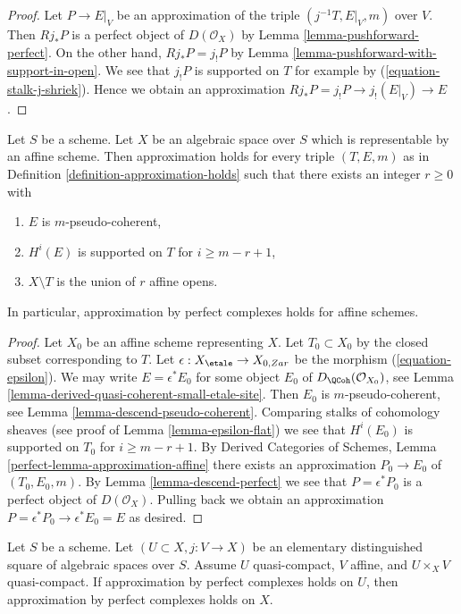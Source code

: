 \begin{proof}
Let $P \to E|_V$ be an approximation of the triple $(j^{-1}T, E|_V, m)$
over $V$. Then $Rj_*P$ is a perfect object of $D(\mathcal{O}_X)$ by
Lemma \ref{lemma-pushforward-perfect}. On the other hand,
$Rj_*P = j_!P$ by Lemma \ref{lemma-pushforward-with-support-in-open}.
We see that $j_!P$ is supported on $T$ for example by
(\ref{equation-stalk-j-shriek}).
Hence we obtain an approximation $Rj_*P = j_!P \to j_!(E|_V) \to E$.
\end{proof}

\begin{lemma}
\label{lemma-approximation-affine}
Let $S$ be a scheme. Let $X$ be an algebraic space over $S$ which is
representable by an affine scheme. Then approximation holds for every
triple $(T, E, m)$ as in Definition \ref{definition-approximation-holds}
such that there exists an integer $r \geq 0$ with
\begin{enumerate}
\item $E$ is $m$-pseudo-coherent,
\item $H^i(E)$ is supported on $T$ for $i \geq m - r + 1$,
\item $X \setminus T$ is the union of $r$ affine opens.
\end{enumerate}
In particular, approximation by perfect complexes holds for affine schemes.
\end{lemma}

\begin{proof}
Let $X_0$ be an affine scheme representing $X$. Let $T_0 \subset X_0$
by the closed subset corresponding to $T$. Let
$\epsilon : X_\etale \to X_{0, Zar}$ be the morphism
(\ref{equation-epsilon}). We may write $E = \epsilon^*E_0$ for some object
$E_0$ of $D_\QCoh(\mathcal{O}_{X_0})$, see
Lemma \ref{lemma-derived-quasi-coherent-small-etale-site}.
Then $E_0$ is $m$-pseudo-coherent, see
Lemma \ref{lemma-descend-pseudo-coherent}.
Comparing stalks of cohomology sheaves (see proof of
Lemma \ref{lemma-epsilon-flat})
we see that $H^i(E_0)$ is supported on $T_0$ for $i \geq m - r + 1$. By
Derived Categories of Schemes, Lemma \ref{perfect-lemma-approximation-affine}
there exists an approximation $P_0 \to E_0$ of
$(T_0, E_0, m)$. By Lemma \ref{lemma-descend-perfect}
we see that $P = \epsilon^*P_0$ is a perfect object of $D(\mathcal{O}_X)$.
Pulling back we obtain an approximation
$P = \epsilon^*P_0 \to \epsilon^*E_0 = E$ as desired.
\end{proof}

\begin{lemma}
\label{lemma-induction-step}
Let $S$ be a scheme. Let $(U \subset X, j : V \to X)$ be an
elementary distinguished square of algebraic spaces over $S$.
Assume $U$ quasi-compact, $V$ affine, and $U \times_X V$ quasi-compact.
If approximation by perfect complexes holds on $U$,
then approximation by perfect complexes holds on $X$.
\end{lemma}

